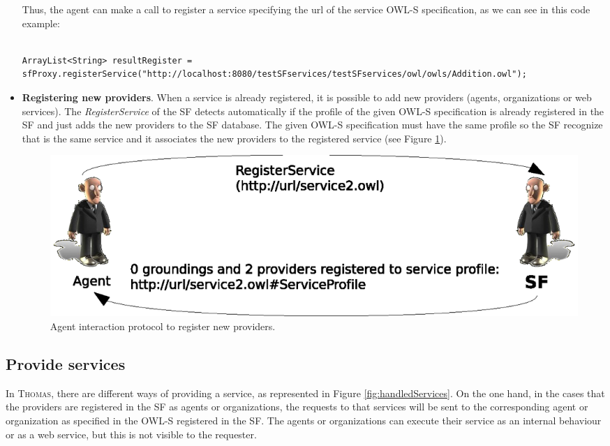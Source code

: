 \begin{itemize}
Thus, the agent can make a call to register a service specifying the url of the service OWL-S specification, as we can see in this code example:

\begin{lstlisting}

ArrayList<String> resultRegister = sfProxy.registerService("http://localhost:8080/testSFservices/testSFservices/owl/owls/Addition.owl");
\end{lstlisting}

\item \textbf{Registering new providers}. When a service is already registered, it is possible to add new providers (agents, organizations or web services). The \textit{RegisterService} of the SF detects automatically if the profile of the given OWL-S specification is already registered in the SF and just adds the new providers to the SF database. The given OWL-S specification must have the same profile so the SF recognize that is the same service and it associates the new providers to the registered service (see Figure \ref{fig:registerServiceProv}).

\begin{figure}[h!t]
	\centering
	\includegraphics[width=.8\textwidth]{Thomas/images/registerServiceProv}
	\caption{Agent interaction protocol to register new providers.}
	\label{fig:registerServiceProv}
\end{figure}


\end{itemize}

\subsection{Provide services}
In \textsc{Thomas}, there are different ways of providing a service, as represented in Figure \ref{fig:handledServices}. On the one hand, in the cases that the providers are registered in the SF as agents or organizations, the requests to that services will be sent to the corresponding agent or organization as specified in the OWL-S registered in the SF. The agents or organizations can execute their service as an internal behaviour or as a web service, but this is not visible to the requester.


